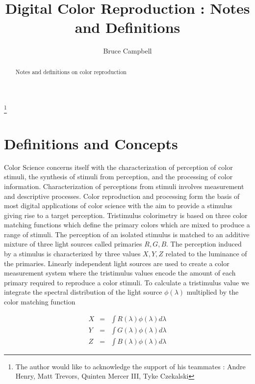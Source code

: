 \documentclass{amsart}
\theoremstyle{definition}
\theoremstyle{remark}
\numberwithin{equation}{section}
\begin{document}
\title{Digital Color Reproduction : Notes and Definitions }
\author{Bruce Campbell}%
\address{}%
%
\thanks{The author would like to acknowledge the support of his teammates : Andre Henry, Matt Trevors, Quinten Mercer III, Tyke Czekalski}%
\begin{abstract}
Notes and definitions on color reproduction
\end{abstract}
\maketitle
\section{Definitions and Concepts}
Color Science concerns itself with the characterization of perception of color stimuli, the synthesis of stimuli from perception, and the processing of color information.  Characterization of perceptions from stimuli involves measurement and descriptive processes.  Color reproduction and processing form the basis of most digital applications of color science with the aim to provide a stimulus giving rise to a target perception.  Tristimulus colorimetry is based on three color matching functions which define the primary colors which are mixed to produce a range of stimuli.  The perception of an isolated stimulus is matched to an additive mixture of three light sources called primaries $R, G, B$.  The perception induced by a stimulus is characterized by three values $X, Y, Z$ related to the luminance of the primaries.  Linearly independent light sources are used to create a color measurement system where the tristimulus values encode the amount of each primary required to reproduce a color stimuli.  To calculate a tristimulus value we integrate the spectral distribution of the light source $\phi(\lambda)$ multiplied by the color matching function

\begin{eqnarray*}
\nonumber
  X &=& \int R(\lambda) \phi(\lambda) d\lambda  \\
  Y &=& \int G(\lambda) \phi(\lambda) d\lambda \\
  Z &=& \int B(\lambda) \phi(\lambda) d\lambda
\end{eqnarray*}
\end{document}
